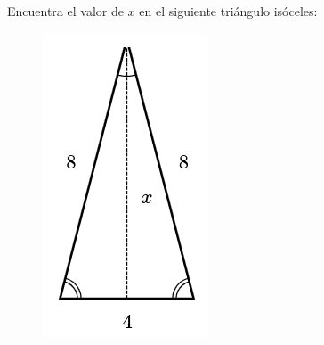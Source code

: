 Encuentra el valor de $x$ en el siguiente triángulo isóceles:

\begin{figure}[H]
    \centering
    \includegraphics[width=0.15\linewidth]{../images/pitagoras1.png}
    \caption{}
    \label{fig:pitagoras1}
\end{figure}

